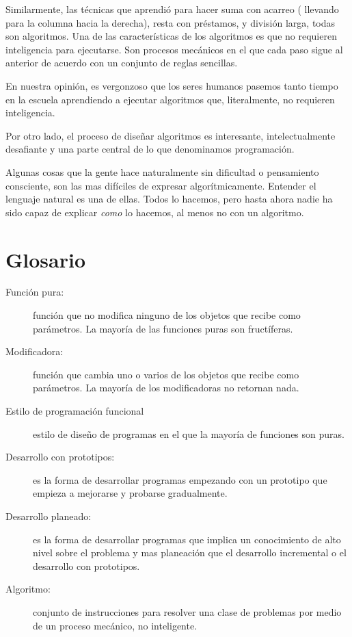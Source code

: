 Similarmente, las técnicas que aprendió para hacer suma con acarreo ( 
llevando para la columna hacia la derecha), resta con préstamos, y 
división larga, todas son algoritmos. Una de las características
de los algoritmos es que no requieren inteligencia para ejecutarse.
Son procesos mecánicos en el que cada paso sigue al anterior
de acuerdo con un conjunto de reglas sencillas.

En nuestra opinión, es vergonzoso que los seres humanos pasemos
tanto tiempo en la escuela aprendiendo a ejecutar algoritmos que, 
literalmente, no requieren inteligencia.

Por otro lado, el proceso de diseñar algoritmos es interesante,
intelectualmente desafiante y una parte central de lo que 
denominamos programación.

Algunas cosas que la gente hace naturalmente sin dificultad o 
pensamiento consciente, son las mas difíciles de expresar algorítmicamente.
Entender el lenguaje natural es una de ellas. Todos lo hacemos, pero
hasta ahora nadie ha sido capaz de explicar {\em como} lo hacemos, al menos
no con un algoritmo.


\section{Glosario}

\begin{description}

\item[Función pura:] función que no modifica ninguno de los objetos
que recibe como parámetros. La mayoría de las funciones puras son 
fructíferas.

\item[Modificadora:] función que cambia uno o varios de los objetos
que recibe como parámetros. La mayoría de los modificadoras no retornan
nada.

\item[Estilo de programación funcional] estilo de diseño de programas en 
el que la mayoría de funciones son puras.

\item[Desarrollo con prototipos:] es la forma de desarrollar programas empezando
con un prototipo que empieza a mejorarse y probarse gradualmente.

\item[Desarrollo planeado:] es la forma de desarrollar programas que implica
un conocimiento de alto nivel sobre el problema y mas planeación que
el desarrollo incremental o el desarrollo con prototipos.

\item[Algoritmo:]  conjunto de instrucciones para resolver una clase de
problemas por medio de un proceso mecánico, no inteligente.


\end{description}

